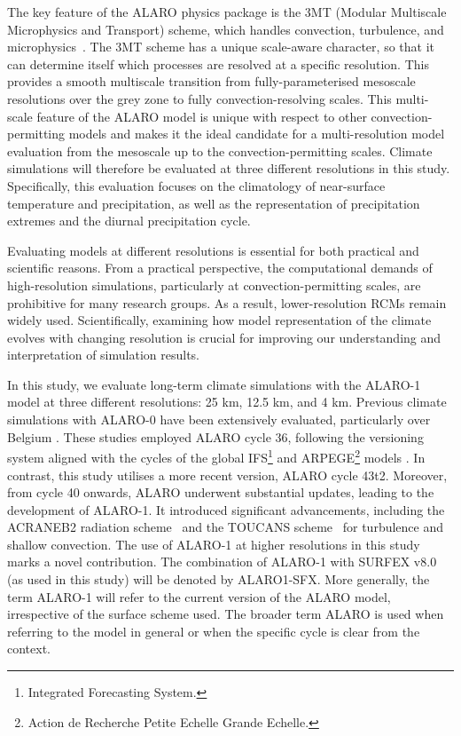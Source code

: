 \documentclass[journal abbreviation, manuscript]{copernicus}
\begin{document}
The key feature of the ALARO physics package is the 3MT (Modular Multiscale Microphysics and Transport) scheme, which handles convection, turbulence, and microphysics~\citep{gerard_evolution_2005, gerard_integrated_2007, gerard_cloud_2009}.
The 3MT scheme has a unique scale-aware character, so that it can determine itself which processes are resolved at a specific resolution.
This provides a smooth multiscale transition from fully-parameterised mesoscale resolutions over the grey zone to fully convection-resolving scales.
This multi-scale feature of the ALARO model is unique with respect to other convection-permitting models and makes it the ideal candidate for a multi-resolution model evaluation from the mesoscale up to the convection-permitting scales.
Climate simulations will therefore be evaluated at three different resolutions in this study. 
Specifically, this evaluation focuses on the climatology of near-surface temperature and precipitation, as well as the representation of precipitation extremes and the diurnal precipitation cycle.

Evaluating models at different resolutions is essential for both practical and scientific reasons. 
From a practical perspective, the computational demands of high-resolution simulations, particularly at convection-permitting scales, are prohibitive for many research groups. 
As a result, lower-resolution RCMs remain widely used.
Scientifically, examining how model representation of the climate evolves with changing resolution is crucial for improving our understanding and interpretation of simulation results.

In this study, we evaluate long-term climate simulations with the ALARO-1 model at three different resolutions: 25 km, 12.5 km, and 4 km. 
Previous climate simulations with ALARO-0 have been extensively evaluated, particularly over Belgium \citep{de_troch_multiscale_2013, hamdi_evaluating_2014, giot_validation_2016, tabari_local_2016, berckmans_reinitialised_2017, top_evaluation_2021}. 
These studies employed ALARO cycle 36, following the versioning system aligned with the cycles of the global IFS\footnote{Integrated Forecasting System.} and ARPEGE\footnote{Action de Recherche Petite Echelle Grande Echelle.} models \citep{termonia_aladin_2018}. 
In contrast, this study utilises a more recent version, ALARO cycle 43t2. 
Moreover, from cycle 40 onwards, ALARO underwent substantial updates, leading to the development of ALARO-1.
It introduced significant advancements, including the ACRANEB2 radiation scheme~\citep{masek_single_2016, geleyn_single_2017} and the TOUCANS scheme~\citep{duran_compact_2014, marquet_general_2013} for turbulence and shallow convection. 
The use of ALARO-1 at higher resolutions in this study marks a novel contribution.
The combination of ALARO-1 with SURFEX v8.0 (as used in this study) will be denoted by ALARO1-SFX.
More generally, the term ALARO-1 will refer to the current version of the ALARO model, irrespective of the surface scheme used. 
The broader term ALARO is used when referring to the model in general or when the specific cycle is clear from the context.
\end{document}
